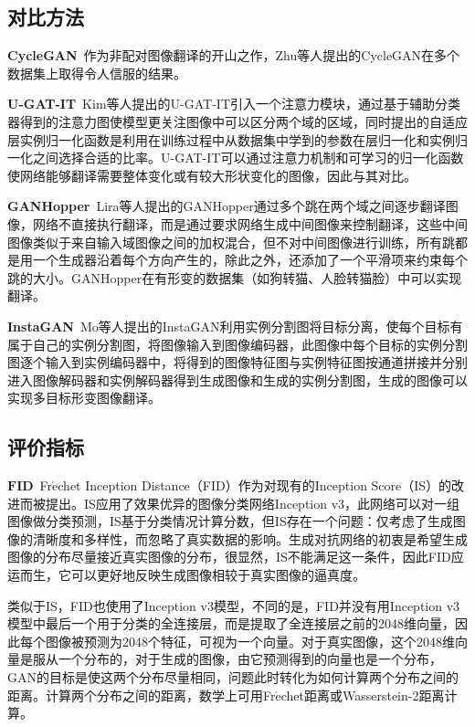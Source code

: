 \subsection{对比方法}

\textbf{CycleGAN}~作为非配对图像翻译的开山之作，Zhu等人\cite{zhu2017unpaired}提出的CycleGAN在多个数据集上取得令人信服的结果。

\textbf{U-GAT-IT}~Kim等人\cite{kim2019u}提出的U-GAT-IT引入一个注意力模块，通过基于辅助分类器得到的注意力图使模型更关注图像中可以区分两个域的区域，同时提出的自适应层实例归一化函数是利用在训练过程中从数据集中学到的参数在层归一化和实例归一化之间选择合适的比率。U-GAT-IT可以通过注意力机制和可学习的归一化函数使网络能够翻译需要整体变化或有较大形状变化的图像，因此与其对比。

\textbf{GANHopper}~Lira等人\cite{lira2020ganhopper}提出的GANHopper通过多个跳在两个域之间逐步翻译图像，网络不直接执行翻译，而是通过要求网络生成中间图像来控制翻译，这些中间图像类似于来自输入域图像之间的加权混合，但不对中间图像进行训练，所有跳都是用一个生成器沿着每个方向产生的，除此之外，还添加了一个平滑项来约束每个跳的大小。GANHopper在有形变的数据集（如狗转猫、人脸转猫脸）中可以实现翻译。

\textbf{InstaGAN}~Mo等人\cite{mo2018instagan}提出的InstaGAN利用实例分割图将目标分离，使每个目标有属于自己的实例分割图，将图像输入到图像编码器，此图像中每个目标的实例分割图逐个输入到实例编码器中，将得到的图像特征图与实例特征图按通道拼接并分别进入图像解码器和实例解码器得到生成图像和生成的实例分割图，生成的图像可以实现多目标形变图像翻译。

\subsection{评价指标}

$\mathbf{FID}$~Fr$\mathrm{\acute{e}}$chet Inception Distance（FID\cite{heusel2017gans}）作为对现有的Inception Score（IS\cite{salimans2016improved}）的改进而被提出。IS应用了效果优异的图像分类网络Inception v3，此网络可以对一组图像做分类预测，IS基于分类情况计算分数，但IS存在一个问题：仅考虑了生成图像的清晰度和多样性，而忽略了真实数据的影响。生成对抗网络的初衷是希望生成图像的分布尽量接近真实图像的分布，很显然，IS不能满足这一条件，因此FID应运而生，它可以更好地反映生成图像相较于真实图像的逼真度。

类似于IS，FID也使用了Inception v3模型，不同的是，FID并没有用Inception v3模型中最后一个用于分类的全连接层，而是提取了全连接层之前的2048维向量，因此每个图像被预测为2048个特征，可视为一个向量。对于真实图像，这个2048维向量是服从一个分布的，对于生成的图像，由它预测得到的向量也是一个分布，GAN的目标是使这两个分布尽量相同，问题此时转化为如何计算两个分布之间的距离。计算两个分布之间的距离，数学上可用Fr$\mathrm{\acute{e}}$chet距离或Wasserstein-2距离计算。

